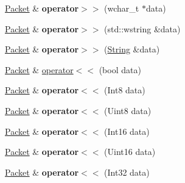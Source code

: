 \begin{DoxyCompactItemize}
\item 
\hypertarget{classsf_1_1_packet_a1444500d29df0991e630ac78933c6282}{\hyperlink{classsf_1_1_packet}{Packet} \& {\bfseries operator$>$$>$} (wchar\+\_\+t $\ast$data)}\label{classsf_1_1_packet_a1444500d29df0991e630ac78933c6282}

\item 
\hypertarget{classsf_1_1_packet_ab74c37a290385fd7b1f962bf954a2005}{\hyperlink{classsf_1_1_packet}{Packet} \& {\bfseries operator$>$$>$} (std\+::wstring \&data)}\label{classsf_1_1_packet_ab74c37a290385fd7b1f962bf954a2005}

\item 
\hypertarget{classsf_1_1_packet_a081233e0cab2182a219b129a1383dc0b}{\hyperlink{classsf_1_1_packet}{Packet} \& {\bfseries operator$>$$>$} (\hyperlink{classsf_1_1_string}{String} \&data)}\label{classsf_1_1_packet_a081233e0cab2182a219b129a1383dc0b}

\item 
\hyperlink{classsf_1_1_packet}{Packet} \& \hyperlink{classsf_1_1_packet_aa5a465ed02ba29d83ecdafb0ac3fff21}{operator$<$$<$} (bool data)
\item 
\hypertarget{classsf_1_1_packet_a034b68a4281cae0b53a43af7aa4172f6}{\hyperlink{classsf_1_1_packet}{Packet} \& {\bfseries operator$<$$<$} (Int8 data)}\label{classsf_1_1_packet_a034b68a4281cae0b53a43af7aa4172f6}

\item 
\hypertarget{classsf_1_1_packet_af27e4498bf83151b0591d5f04a8b30e1}{\hyperlink{classsf_1_1_packet}{Packet} \& {\bfseries operator$<$$<$} (Uint8 data)}\label{classsf_1_1_packet_af27e4498bf83151b0591d5f04a8b30e1}

\item 
\hypertarget{classsf_1_1_packet_afda8754ab4f2a34600f0153ba9ff24fa}{\hyperlink{classsf_1_1_packet}{Packet} \& {\bfseries operator$<$$<$} (Int16 data)}\label{classsf_1_1_packet_afda8754ab4f2a34600f0153ba9ff24fa}

\item 
\hypertarget{classsf_1_1_packet_a557cbc0289135209248aca1aa2117c40}{\hyperlink{classsf_1_1_packet}{Packet} \& {\bfseries operator$<$$<$} (Uint16 data)}\label{classsf_1_1_packet_a557cbc0289135209248aca1aa2117c40}

\item 
\hypertarget{classsf_1_1_packet_ad60c9ad6e4e92399e2a36938ad122d05}{\hyperlink{classsf_1_1_packet}{Packet} \& {\bfseries operator$<$$<$} (Int32 data)}\label{classsf_1_1_packet_ad60c9ad6e4e92399e2a36938ad122d05}


\end{DoxyCompactItemize}

